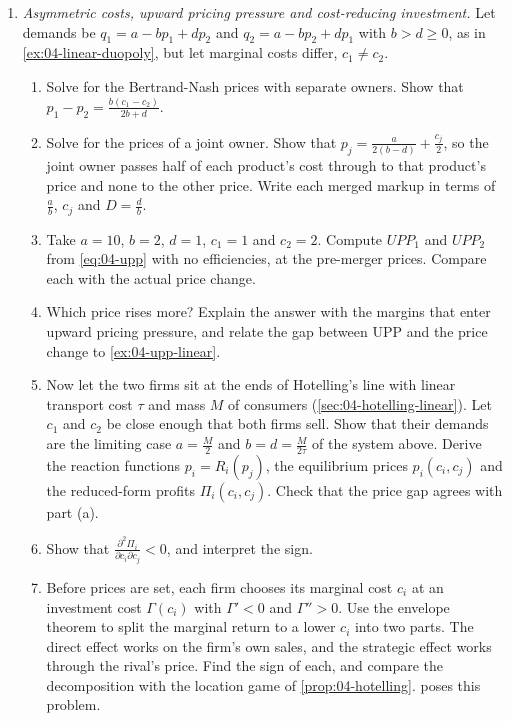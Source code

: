 \begin{enumerate}[label=\arabic*., leftmargin=*, itemsep=6pt]

\item \textit{Asymmetric costs, upward pricing pressure and cost-reducing investment.} Let demands be $q_1 = a - bp_1 + dp_2$ and
$q_2 = a - bp_2 + dp_1$ with $b > d \ge 0$, as in \cref{ex:04-linear-duopoly}, but let marginal costs differ,
$c_1 \ne c_2$.
\begin{enumerate}[label=(\alph*)]
  \item Solve for the Bertrand-Nash prices with separate owners. Show that $p_1 - p_2 = \frac{b(c_1 - c_2)}{2b + d}$.
  \item Solve for the prices of a joint owner. Show that $p_j = \frac{a}{2(b - d)} + \frac{c_j}{2}$, so the joint
  owner passes half of each product's cost through to that product's price and none to the other price. Write each
  merged markup in terms of $\frac{a}{b}$, $c_j$ and $D = \frac{d}{b}$.
  \item Take $a = 10$, $b = 2$, $d = 1$, $c_1 = 1$ and $c_2 = 2$. Compute $\mathit{UPP}_1$ and $\mathit{UPP}_2$ from
  \eqref{eq:04-upp} with no efficiencies, at the pre-merger prices. Compare each with the actual price change.
  \item Which price rises more? Explain the answer with the margins that enter upward pricing pressure, and relate
  the gap between UPP and the price change to \cref{ex:04-upp-linear}.
  \item Now let the two firms sit at the ends of Hotelling's line with linear transport cost $\tau$ and mass $M$
  of consumers (\cref{sec:04-hotelling-linear}). Let $c_1$ and $c_2$ be close enough that both firms sell. Show that
  their demands are the limiting case $a = \frac{M}{2}$ and $b = d = \frac{M}{2\tau}$ of the system above. Derive the
  reaction functions $p_i = R_i(p_j)$, the equilibrium prices $p_i(c_i, c_j)$ and the reduced-form profits
  $\Pi_i(c_i, c_j)$. Check that the price gap agrees with part (a).
  \item Show that $\frac{\partial^2\Pi_i}{\partial c_i\partial c_j} < 0$, and interpret the sign.
  \item Before prices are set, each firm chooses its marginal cost $c_i$ at an investment cost $\Gamma(c_i)$ with
  $\Gamma' < 0$ and $\Gamma'' > 0$. Use the envelope theorem to split the marginal return to a lower $c_i$ into two
  parts. The direct effect works on the firm's own sales, and the strategic effect works through the rival's price.
  Find the sign of each, and compare the decomposition with the location game of \cref{prop:04-hotelling}.
  \citet[Section 7.1.1, Exercise 7.2]{Tirole1988} poses this problem.
\end{enumerate}


\end{enumerate}
